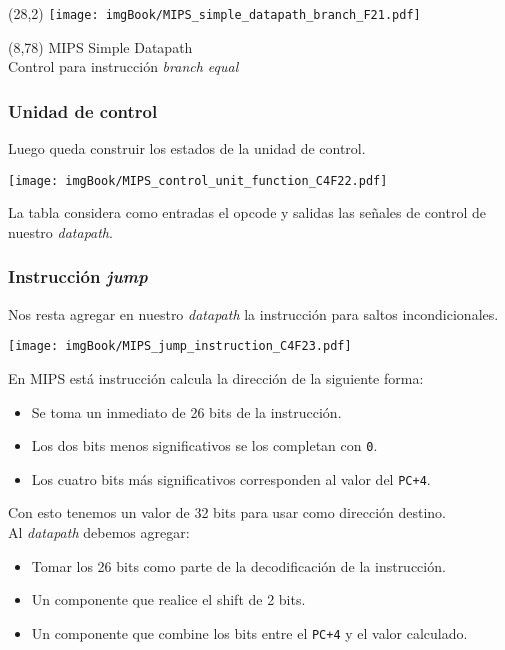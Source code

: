 \documentclass[aspectratio=169]{beamer}
\begin{document}
\begin{frame}[t,fragile]
    \begin{textblock}{80}(28,2)
    \texttt{[image: imgBook/MIPS\_simple\_datapath\_branch\_F21.pdf]}
    \end{textblock}
    \begin{textblock}{80}(8,78)
    \textcolor{naranjauca}{\Large MIPS Simple Datapath\\ \normalsize Control para instrucción \emph{branch equal}}
    \end{textblock}
\end{frame}

\begin{frame}[t,fragile]
    \frametitle{Unidad de control}
    Luego queda construir los estados de la unidad de control.
    \begin{center}
    \texttt{[image: imgBook/MIPS\_control\_unit\_function\_C4F22.pdf]}
    \end{center}
    \vspace{-0.3cm}
    La tabla considera como entradas el opcode y salidas las señales de control de nuestro \emph{datapath}.
\end{frame}

\begin{frame}[t,fragile]
    \frametitle{Instrucción \emph{jump}}
    Nos resta agregar en nuestro \emph{datapath} la instrucción para saltos incondicionales.
    \begin{center}
    \texttt{[image: imgBook/MIPS\_jump\_instruction\_C4F23.pdf]}
    \end{center}
    \pause
    En MIPS está instrucción calcula la dirección de la siguiente forma:
    \begin{itemize}
     \item \textcolor{verdeuca}{Se toma un inmediato de 26 bits de la instrucción.}
     \item \textcolor{verdeuca}{Los dos bits menos significativos se los completan con \texttt{0}.}
     \item \textcolor{verdeuca}{Los cuatro bits más significativos corresponden al valor del \texttt{PC+4}.}
    \end{itemize}
    Con esto tenemos un valor de 32 bits para usar como dirección destino.\\
    \pause
    \bigskip
    Al \emph{datapath} debemos agregar:
    \begin{itemize}
     \item \textcolor{verdeuca}{Tomar los 26 bits como parte de la decodificación de la instrucción.}
     \item \textcolor{verdeuca}{Un componente que realice el shift de 2 bits.}
     \item \textcolor{verdeuca}{Un componente que combine los bits entre el \texttt{PC+4} y el valor calculado.}
    \end{itemize}
\end{frame}
\end{document}
